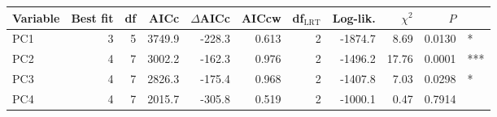 
\begin{tabular}{lrrrrrrrrrl}
\toprule
Variable & Best fit & df & AICc & $\Delta$AICc & AICcw & df$_{\mbox{LRT}}$ & Log-lik. & $\chi^2$ & $P$ & \\
\midrule
PC1 & 3 & 5 & 3749.9 & -228.3 & 0.613 & 2 & -1874.7 & 8.69 & 0.0130 & *\\
PC2 & 4 & 7 & 3002.2 & -162.3 & 0.976 & 2 & -1496.2 & 17.76 & 0.0001 & ***\\
PC3 & 4 & 7 & 2826.3 & -175.4 & 0.968 & 2 & -1407.8 & 7.03 & 0.0298 & *\\
PC4 & 4 & 7 & 2015.7 & -305.8 & 0.519 & 2 & -1000.1 & 0.47 & 0.7914 & \\
\bottomrule
\end{tabular}
